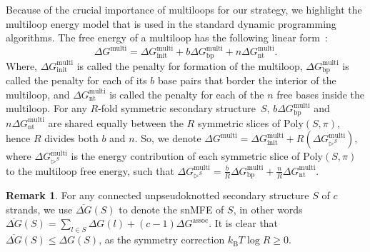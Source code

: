 \documentclass[11pt,letterpaper]{article}  \usepackage[margin=1in]{geometry}
\theoremstyle{definition}  \newtheorem{Definition}[theorem]{Definition}
\newtheorem{note}[theorem]{Remark} \newtheorem{remark}[theorem]{Remark}
\newcommand{\snMFE}{snMFE\xspace}
\newcommand{\PolySpi}{\ensuremath{\mathrm{Poly}(S,\pi)}\xspace}
\begin{document}
Because of the crucial importance of multiloops for our strategy, we highlight the multiloop energy model that is used in the standard dynamic programming algorithms. The free energy of a multiloop has the following linear form~\cite{dirks2007thermodynamic}:
\begin{equation} \label{eq:multi}
	\Delta G^ \textrm{multi}  = \Delta G_\textrm{init}^\textrm{multi} + b \Delta G_\textrm{bp}^\textrm{multi} + n\Delta G_\textrm{nt}^\textrm{multi}.
\end{equation}
Where, $\Delta G_\textrm{init}^\textrm{multi}$ is called the penalty for   formation of the multiloop, $\Delta G_\textrm{bp}^\textrm{multi}$ is called the penalty for each of its $b$ base pairs that border the interior of the multiloop, and $\Delta G_\textrm{nt}^\textrm{multi}$ is called the penalty for each of the $n$ free bases inside the multiloop. For any $R$-fold symmetric secondary structure~$S$, 
$b \Delta G_\textrm{bp}^\textrm{multi}$ and $n\Delta G_\textrm{nt}^\textrm{multi}$ are shared equally between the $R$ symmetric slices of $\PolySpi$, hence $R$ divides both $b$ and $n$. So, we denote  $\Delta G^ \textrm{multi}  = \Delta G_\textrm{init}^\textrm{multi} + R(\Delta G_{\rhd^{S}}^\textrm{multi})$, where $\Delta G_{\rhd^{S}}^\textrm{multi}$ is the energy contribution of each symmetric slice of $\PolySpi$ to the multiloop free energy, such that $\Delta G_{\rhd^{S}}^\textrm{multi} = \frac{b}{R} \Delta G_\textrm{bp}^\textrm{multi} + \frac{n}{R} \Delta G_\textrm{nt}^\textrm{multi}$.

\begin{note}
	For any connected unpseudoknotted secondary structure $S$ of $c$ strands, we use $\overline{\Delta G}(S)$ to denote the \snMFE of $S$, in other words $\overline{\Delta G}(S) = \sum_{l\in S} \Delta G(l)
	+  (c-1)\Delta G^{\textrm{assoc}}$. It is clear that $\overline{\Delta G}(S) \leq \Delta G(S)$, as the symmetry correction $k_\mathrm{B} T \log R \geq 0$. 
\end{note}
\end{document}
